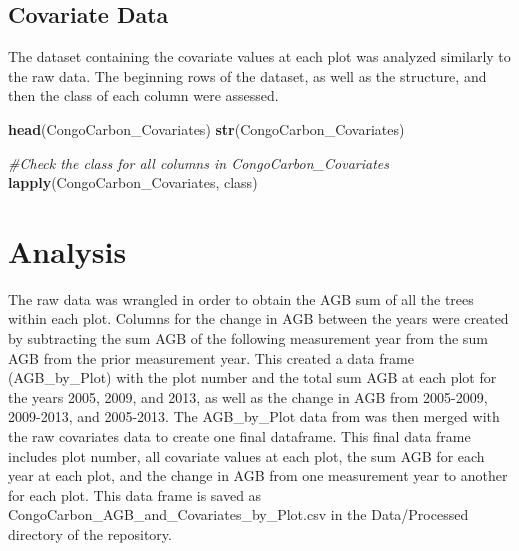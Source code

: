 \documentclass[12pt,]{article}
\newenvironment{Shaded}{\begin{snugshade}}{\end{snugshade}}
\newcommand{\CommentTok}[1]{\textcolor[rgb]{0.56,0.35,0.01}{\textit{#1}}}
\newcommand{\KeywordTok}[1]{\textcolor[rgb]{0.13,0.29,0.53}{\textbf{#1}}}
\newcommand{\NormalTok}[1]{#1}
\begin{document}
\hypertarget{covariate-data}{%
\subsection{Covariate Data}\label{covariate-data}}

The dataset containing the covariate values at each plot was analyzed
similarly to the raw data. The beginning rows of the dataset, as well as
the structure, and then the class of each column were assessed.

\begin{Shaded}
\begin{Highlighting}[]
\KeywordTok{head}\NormalTok{(CongoCarbon_Covariates)}
\KeywordTok{str}\NormalTok{(CongoCarbon_Covariates)}

\CommentTok{#Check the class for all columns in CongoCarbon_Covariates}
\KeywordTok{lapply}\NormalTok{(CongoCarbon_Covariates, class)}
\end{Highlighting}
\end{Shaded}

\hypertarget{analysis}{%
\section{Analysis}\label{analysis}}

The raw data was wrangled in order to obtain the AGB sum of all the
trees within each plot. Columns for the change in AGB between the years
were created by subtracting the sum AGB of the following measurement
year from the sum AGB from the prior measurement year. This created a
data frame (AGB\_by\_Plot) with the plot number and the total sum AGB at
each plot for the years 2005, 2009, and 2013, as well as the change in
AGB from 2005-2009, 2009-2013, and 2005-2013. The AGB\_by\_Plot data
from was then merged with the raw covariates data to create one final
dataframe. This final data frame includes plot number, all covariate
values at each plot, the sum AGB for each year at each plot, and the
change in AGB from one measurement year to another for each plot. This
data frame is saved as CongoCarbon\_AGB\_and\_Covariates\_by\_Plot.csv
in the Data/Processed directory of the repository.
\end{document}
